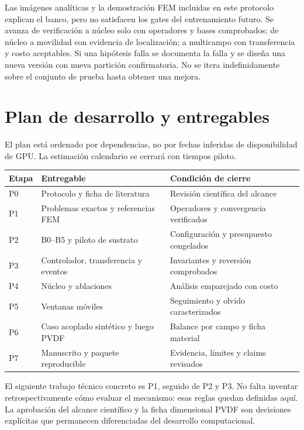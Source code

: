 Las imágenes analíticas y la demostración FEM incluidas en este protocolo explican el banco, pero no satisfacen los gates del entrenamiento futuro. Se avanza de verificación a núcleo solo con operadores y bases comprobados; de núcleo a movilidad con evidencia de localización; a multicampo con transferencia y costo aceptables. Si una hipótesis falla se documenta la falla y se diseña una nueva versión con nueva partición confirmatoria. No se itera indefinidamente sobre el conjunto de prueba hasta obtener una mejora.

\chapter{Plan de desarrollo y entregables}
El plan está ordenado por dependencias, no por fechas inferidas de disponibilidad de GPU. La estimación calendario se cerrará con tiempos piloto.
\begin{longtable}{p{.13\linewidth}p{.42\linewidth}p{.35\linewidth}}\toprule
Etapa & Entregable & Condición de cierre\\\midrule
P0 & Protocolo y ficha de literatura & Revisión científica del alcance\\
P1 & Problemas exactos y referencias FEM & Operadores y convergencia verificados\\
P2 & B0--B5 y piloto de sustrato & Configuración y presupuesto congelados\\
P3 & Controlador, transferencia y eventos & Invariantes y reversión comprobados\\
P4 & Núcleo y ablaciones & Análisis emparejado con costo\\
P5 & Ventanas móviles & Seguimiento y olvido caracterizados\\
P6 & Caso acoplado sintético y luego PVDF & Balance por campo y ficha material\\
P7 & Manuscrito y paquete reproducible & Evidencia, límites y claims revisados\\\bottomrule
\end{longtable}
El siguiente trabajo técnico concreto es P1, seguido de P2 y P3. No falta inventar retrospectivamente cómo evaluar el mecanismo: esas reglas quedan definidas aquí. La aprobación del alcance científico y la ficha dimensional PVDF son decisiones explícitas que permanecen diferenciadas del desarrollo computacional.
